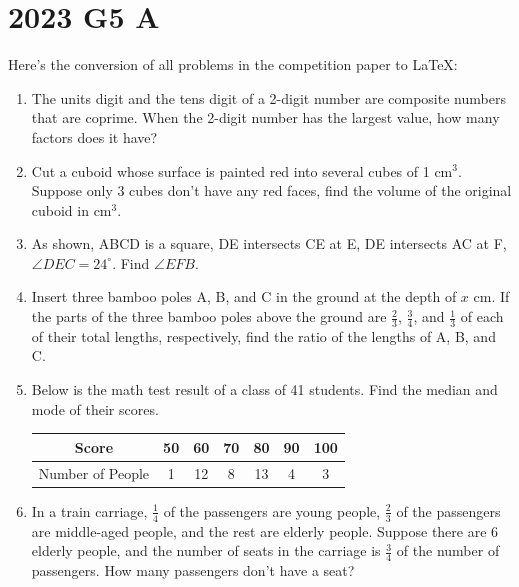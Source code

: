 \documentclass[12pt]{scrartcl}
\begin{document}

\section{2023 G5 A}
Here's the conversion of all problems in the competition paper to LaTeX:

\begin{enumerate}
    \item The units digit and the tens digit of a 2-digit number are composite numbers that are coprime. When the 2-digit number has the largest value, how many factors does it have?
    
    \item Cut a cuboid whose surface is painted red into several cubes of 1 cm$^3$. Suppose only 3 cubes don't have any red faces, find the volume of the original cuboid in cm$^3$.
    
    \item As shown, ABCD is a square, DE intersects CE at E, DE intersects AC at F, $\angle DEC = 24^\circ$. Find $\angle EFB$.
    
    \item Insert three bamboo poles A, B, and C in the ground at the depth of $x$ cm. If the parts of the three bamboo poles above the ground are $\frac{2}{3}$, $\frac{3}{4}$, and $\frac{1}{3}$ of each of their total lengths, respectively, find the ratio of the lengths of A, B, and C.
    
    \item Below is the math test result of a class of 41 students. Find the median and mode of their scores.
    \begin{tabular}{|c|c|c|c|c|c|c|}
    \hline
    Score & 50 & 60 & 70 & 80 & 90 & 100 \\
    \hline
    Number of People & 1 & 12 & 8 & 13 & 4 & 3 \\
    \hline
    \end{tabular}
    
    \item In a train carriage, $\frac{1}{4}$ of the passengers are young people, $\frac{2}{3}$ of the passengers are middle-aged people, and the rest are elderly people. Suppose there are 6 elderly people, and the number of seats in the carriage is $\frac{3}{4}$ of the number of passengers. How many passengers don't have a seat?
    

\end{enumerate}
\end{document}
